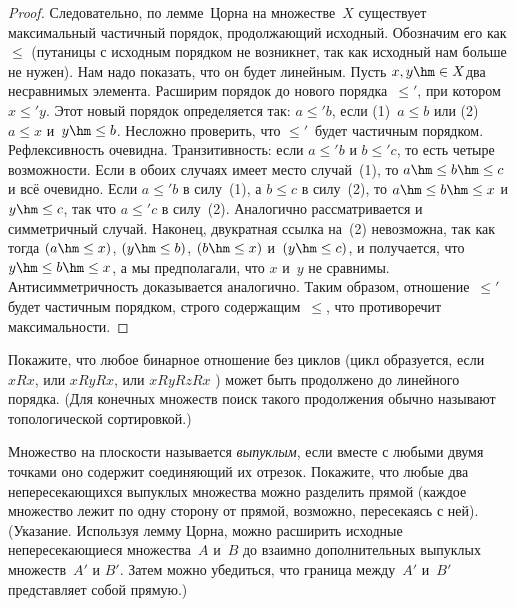 \begin{proof}
Следовательно, по лемме~Цорна на множестве~$X$ существует
максимальный частичный порядок, продолжающий
исходный. Обозначим
его как $\le$ (путаницы с исходным порядком не возникнет,
так как исходный нам больше не нужен). Нам надо показать, что он
будет линейным. Пусть
$x,y\hm\in X$\т два несравнимых элемента. Расширим порядок до
нового порядка~$\le'$, при котором $x\le' y$. Этот новый порядок
определяется так:
$a\le'
b$, если (1)~$a\le b$ или (2)~$a\le x$ и~$y\hm\le b$.
Несложно проверить, что $\le'$~будет
частичным порядком. Рефлексивность очевидна. Транзитивность:
если $a\le'b$ и $b\le' c$, то есть четыре возможности. Если в
обоих случаях имеет место случай~(1), то $a\hm\le b \hm\le c$ и всё
очевидно. Если $a\le' b$ в силу~(1), а $b\le c$ в силу~(2), то
$a\hm\le b\hm\le x$ и $y\hm\le c$, так что $a \le' c$ в силу~(2).
Аналогично рассматривается и симметричный случай. Наконец,
двукратная ссылка на~(2) невозможна, так как тогда $(a\hm\le x)$,
$(y\hm\le b)$, $(b\hm\le x)$ и~$(y\hm\le c)$, и получается, что $y\hm\le b\hm\le x$,
а мы предполагали, что $x$ и~$y$ не сравнимы. Антисимметричность
доказывается аналогично. Таким образом, отношение~$\le'$ будет
частичным порядком, строго содержащим~$\le$, что противоречит
максимальности.
\end{proof}

\begin{problem}
Покажите, что любое бинарное отношение без циклов (цикл
образуется, если $xRx$, или $xRyRx$, или $xRyRzRx$ ) может
быть продолжено до линейного порядка. (Для конечных множеств
поиск такого продолжения обычно называют  топологической
сортировкой.)
\end{problem}

\begin{problem}
Множество на плоскости называется \emph{выпуклым}, если вместе с любыми
двумя точками оно содержит соединяющий их отрезок. Покажите, что
любые два непересекающихся выпуклых множества можно разделить прямой
(каждое множество лежит по одну сторону от прямой, возможно, пересекаясь
с ней). (Указание. Используя лемму Цорна, можно расширить исходные
непересекающиеся множества~$A$ и~$B$ до взаимно дополнительных
выпуклых множеств~$A'$ и $B'$. Затем можно убедиться, что
граница между~$A'$ и~$B'$ представляет собой прямую.)
\end{problem}


